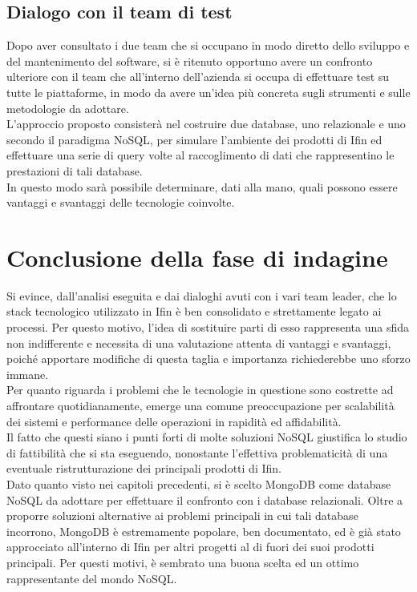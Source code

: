 \subsection{Dialogo con il team di test}
Dopo aver consultato i due team che si occupano in modo diretto dello sviluppo e del mantenimento del software, si è ritenuto opportuno avere un confronto ulteriore con il team che all'interno dell'azienda si occupa di effettuare test su tutte le piattaforme, in modo da avere un'idea più concreta sugli strumenti e sulle metodologie da adottare.\\
L'approccio proposto consisterà nel costruire due database, uno relazionale e uno secondo il paradigma NoSQL, per simulare l'ambiente dei prodotti di Ifin ed effettuare una serie di query volte al raccoglimento di dati che rappresentino le prestazioni di tali database.\\
In questo modo sarà possibile determinare, dati alla mano, quali possono essere vantaggi e svantaggi delle tecnologie coinvolte.\\


\section{Conclusione della fase di indagine}\label{sec:fineindagine}

Si evince, dall'analisi eseguita e dai dialoghi avuti con i vari team leader, che lo stack tecnologico utilizzato in Ifin è ben consolidato e strettamente legato ai processi. Per questo motivo, l'idea di sostituire parti di esso rappresenta una sfida non indifferente e necessita di una valutazione attenta di vantaggi e svantaggi, poiché apportare modifiche di questa taglia e importanza richiederebbe uno sforzo immane.\\
Per quanto riguarda i problemi che le tecnologie in questione sono costrette ad affrontare quotidianamente, emerge una comune preoccupazione per scalabilità dei sistemi e performance delle operazioni in rapidità ed affidabilità.\\
Il fatto che questi siano i punti forti di molte soluzioni NoSQL giustifica lo studio di fattibilità che si sta eseguendo, nonostante l'effettiva problematicità di una eventuale ristrutturazione dei principali prodotti di Ifin.\\

\noindent Dato quanto visto nei capitoli precedenti, si è scelto MongoDB come database NoSQL da adottare per effettuare il confronto con i database relazionali. Oltre a proporre soluzioni alternative ai problemi principali in cui tali database incorrono, MongoDB è estremamente popolare, ben documentato, ed è già stato approcciato all'interno di Ifin per altri progetti al di fuori dei suoi prodotti principali. Per questi motivi, è sembrato una buona scelta ed un ottimo rappresentante del mondo NoSQL.\\

